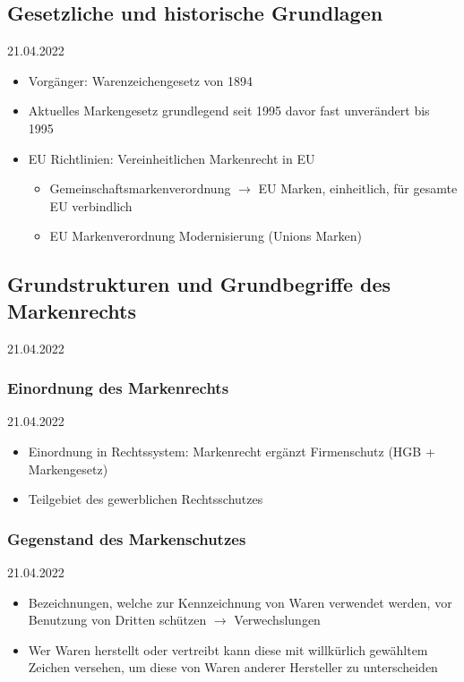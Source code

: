 \documentclass{report}
\begin{document}
\subsection{Gesetzliche und historische Grundlagen}
21.04.2022
\begin{itemize}
	\item Vorgänger: Warenzeichengesetz von 1894
	\item Aktuelles Markengesetz grundlegend seit 1995
	\newline davor fast unverändert bis 1995
	\item EU Richtlinien: Vereinheitlichen Markenrecht in EU
	\begin{itemize}
		\item Gemeinschaftsmarkenverordnung
		\newline $\rightarrow$ EU Marken, einheitlich, für gesamte EU verbindlich
		\item EU Markenverordnung Modernisierung (Unions Marken)
	\end{itemize}
\end{itemize}

\subsection{Grundstrukturen und Grundbegriffe des Markenrechts}
21.04.2022

\subsubsection{Einordnung des Markenrechts}
21.04.2022
\begin{itemize}
	\item Einordnung in Rechtssystem:
	\newline Markenrecht ergänzt Firmenschutz (HGB + Markengesetz)
	\item Teilgebiet des gewerblichen Rechtsschutzes
\end{itemize}

\subsubsection{Gegenstand des Markenschutzes}
21.04.2022
\begin{itemize}
	\item Bezeichnungen, welche zur Kennzeichnung von Waren verwendet werden, vor Benutzung von Dritten schützen $\rightarrow$ Verwechslungen
	\item Wer Waren herstellt oder vertreibt kann diese mit willkürlich gewähltem Zeichen versehen, um diese von Waren anderer Hersteller zu unterscheiden
\end{itemize}
\end{document}
